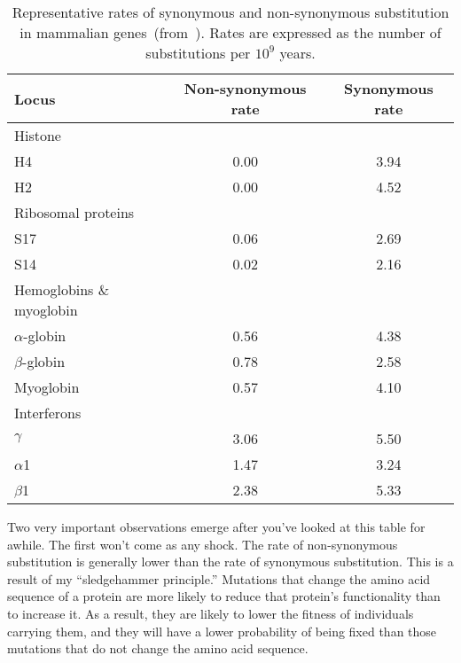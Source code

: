 \documentclass[12pt]{article}
\begin{document}
\begin{table}
\begin{center}
\begin{tabular}{lcc}
\hline\hline
Locus     & Non-synonymous rate & Synonymous rate \\
\hline
Histone \\
\quad H4  & 0.00                & 3.94 \\
\quad H2  & 0.00                & 4.52 \\ 
Ribosomal proteins \\
\quad S17 & 0.06                & 2.69 \\
\quad S14 & 0.02                & 2.16 \\
Hemoglobins \& myoglobin \\
\quad $\alpha$-globin & 0.56    & 4.38 \\
\quad $\beta$-globin  & 0.78    & 2.58 \\
\quad Myoglobin       & 0.57    & 4.10 \\
Interferons \\
\quad $\gamma$  & 3.06          & 5.50 \\
\quad $\alpha$1 & 1.47          & 3.24 \\
\quad $\beta$1  & 2.38          & 5.33 \\
\hline
\end{tabular}
\end{center}
\caption{Representative rates of synonymous and non-synonymous
  substitution in mammalian genes~(from~\cite{Li97}). Rates are
  expressed as the number of substitutions per $10^9$
  years.}\label{table:substitution-data}
\end{table}

Two very important observations emerge after you've looked at this
table for awhile. The first won't come as any shock. The rate of
non-synonymous substitution is generally lower than the rate of
synonymous substitution. This is a result of my ``sledgehammer
principle.'' Mutations that change the amino acid sequence of a
protein are more likely to reduce that protein's functionality than to
increase it. As a result, they are likely to lower the fitness of
individuals carrying them, and they will have a lower probability of
being fixed than those mutations that do not change the amino acid
sequence.
\end{document}
